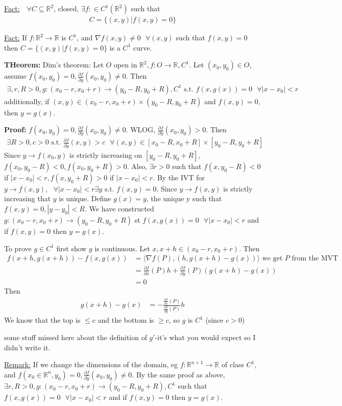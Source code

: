 \documentclass{article}
\newcommand*{\txt}[1]{\text{ #1 }}%
\newcommand*{\iprod}[1]{\langle #1 \rangle}
\newcommand*{\fora}{\txt{}\forall}%
\newcommand*{\rr}{\mathbb{R}}%
\newcommand*{\partials}[2]{\frac{\partial #1}{\partial #2}}%
\begin{document}
\underline{Fact:} $\fora C\subseteq \rr^2$, closed, $\exists f:\in C^1(\rr^2)$ such that \begin{align*}
    C=\{(x,y)|f(x,y)=0\}
\end{align*}

\underline{Fact:} If $f:\rr^2\to \rr$ is $C^1$, and $\nabla f(x,y)\neq 0\fora (x,y)$ such that $f(x,y)=0$ then $C=\{(x,y)|f(x,y)=0\}$ is a $C^1$ curve.

\textbf{THeorem:} Dim's theorem: Let $O$ open in $\rr^2, f:O\to \rr, C^1$. Let $(x_0,y_0)\in O$, assume $f(x_0,y_0)=0, \partials{f}{y}(x_0,y_0)\neq 0$. Then \begin{align*}
    \exists, r,R>0,g:(x_0-r,x_0+r)\to (y_0-R,y_0+R), C^1\txt{s.t.}f(x,g(x))=0\fora |x-x_0|<r
\end{align*}additionally, if $(x,y)\in (x_0-r,x_0+r)\times (y_0-R,y_0+R)$ and $f(x,y)=0$, then $y=g(x)$.

\textbf{Proof:} $f(x_0,y_0)=0, \partials{f}{y}(x_0,y_0)\neq 0$. WLOG, $\partials{f}{y}(x_0,y_0)>0$. Then \begin{align*}
    \exists R>0, c>0\txt{s.t.}\partials{f}{y}(x,y)>c\fora (x,y)\in [x_0-R,x_0+R]\times [y_0-R,y_0+R]
\end{align*}Since $y\to f(x_0,y)$ is strictly increasing on $[y_0-R, y_0+R]$, $f(x_0,y_0-R)<0, f(x_0, y_0+R)>0$. Also, $\exists r>0$ such that $f(x,y_0-R)<0$ if $|x-x_0|<r, f(x,y_0+R)>0$ if $|x-x_0|<r$. By the IVT for $y\to f(x,y), \fora |x-x_0|<r \exists y\txt{s.t.}f(x,y)=0$. Since $y\to f(x,y)$ is strictly increasing that $y$ is unique. Define $g(x)=y$, the unique y such that $f(x,y)=0, |y-y_0|<R$. We have constructed $g:(x_0-r,x_0+r)\to (y_0-R,y_0+R)$ st $f(x,g(x))=0\fora |x-x_0|<r$ and if $f(x,y)=0$ then $y=g(x)$.

To prove $g\in C^1$ first show $g$ is continuous. Let $x,x+h\in (x_0-r, x_0+r)$. Then \begin{align*}
    f(x+h,g(x+h))-f(x,g(x))&=\iprod{\nabla f(P),(h,g(x+h)-g(x))}\txt{we get $P$ from the MVT}\\
    &=\partials{f}{x}(P)h+\partials{f}{y}(P)(g(x+h)-g(x))\\
    &=0
\end{align*}Then \begin{align*}
    g(x+h)-g(x)&=-\frac{\partials{f}{x}(P)}{\partials{f}{y}(P)}h
\end{align*}We know that the top is $\leq c$ and the bottom is $\geq c$, so $g$ is $C^1$ (since $c>0$)

some stuff missed here about the definition of $g'$-it's what you would expect so I didn't write it.

\underline{Remark:} If we change the dimensions of the domain, eg $f:\rr^{n+1}\to \rr$ of class $C^1$, and $f(x_0\in\rr^n,y_0)=0,\partials{f}{y}(x_0,y_0)\neq 0$. By the same proof as above, $\exists r,R>0,g:(x_0-r,x_0+r)\to (y_0-R,y_0+R), C^1$ such that $f(x,g(x))=0\fora |x-x_0|<r$ and if $f(x,y)=0$ then $y=g(x)$.
\end{document}
